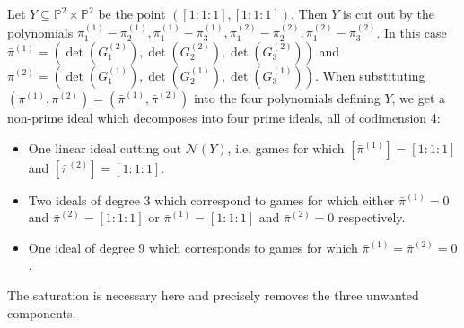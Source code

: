 \documentclass[12pt]{article}
\theoremstyle{definition}
\newenvironment{example}
{\pushQED{\qed}\renewcommand{\qedsymbol}{$\diamond$}\examplex}
{\popQED\endexamplex}
\newcommand{\PP}{{\mathbb P}}
\newcommand{\kn}{{\mathcal N}}
\begin{document}
\begin{example}
Let $Y\subseteq \PP^2\times \PP^2$ be the point $([1:1:1],[1:1:1])$. Then $Y$ is cut out by the polynomials $\pi_1^{(1)}-\pi_2^{(1)},\pi_1^{(1)}-\pi_3^{(1)},\pi_1^{(2)}-\pi_2^{(2)},\pi_1^{(2)}-\pi_3^{(2)}$. In this case $\bar{\pi}^{(1)} = (\det(G_1^{(2)}),\det(G_2^{(2)}),\det(G_3^{(2)}))$ and $\bar{\pi}^{(2)} = (\det(G_1^{(1)}),\det(G_2^{(1)}),\det(G_3^{(1)}))$. When substituting $(\pi^{(1)},\pi^{(2)})=(\bar{\pi}^{(1)},\bar{\pi}^{(2)})$ into the four polynomials defining $Y$, we get a non-prime ideal which decomposes into four prime ideals, all of codimension 4:
\begin{itemize}
    \item[$(i)$] One linear ideal cutting out $\kn(Y)$, i.e. games for which $[\bar{\pi}^{(1)}]=[1:1:1]$ and $[\bar{\pi}^{(2)}]=[1:1:1]$.
    \item[$(ii)$] Two ideals of degree 3 which correspond to games for which either $\bar{\pi}^{(1)}=0$ and $\bar{\pi}^{(2)}=[1:1:1]$ or $\bar{\pi}^{(1)}=[1:1:1]$ and $\bar{\pi}^{(2)}=0$ respectively.
    \item[$(iii)$] One ideal of degree 9 which corresponds to games for which $\bar{\pi}^{(1)}=\bar{\pi}^{(2)}=0$.
\end{itemize}
The saturation is necessary here and precisely removes the three unwanted components.
\end{example}
\end{document}
